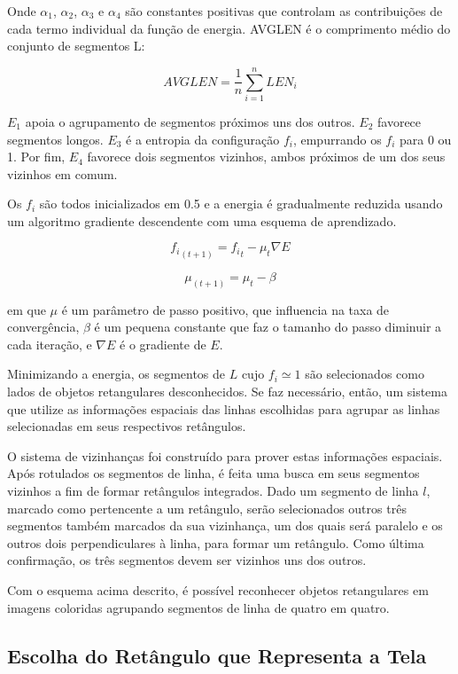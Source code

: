Onde $ \alpha _1 $, $ \alpha _2 $, $ \alpha _3 $ e $ \alpha _4 $ são constantes positivas que controlam as contribuições de cada termo individual da função de energia. AVGLEN é o comprimento médio do conjunto de segmentos L:

$$ AVGLEN = \frac{1}{n} \displaystyle \sum_{i=1}^{n} LEN_i $$

$E_1$ apoia o agrupamento de segmentos próximos uns dos outros. $E_2$ favorece segmentos longos. $E_3$ é a entropia da configuração ${f_i}$, empurrando os ${f_i}$ para 0 ou 1. Por fim, $E_4$ favorece dois segmentos vizinhos, ambos próximos de um dos seus vizinhos em comum.

Os $ {f_i} $ são todos inicializados em 0.5 e a energia é gradualmente reduzida usando um algoritmo gradiente descendente com uma esquema de aprendizado.

$$ {f_i}_{(t+1)} = {f_i}_t - \mu_t \nabla E $$

$$ \mu_{(t+1)} = \mu_t - \beta $$

em que $\mu$ é um parâmetro de passo positivo, que influencia na taxa de convergência, $\beta$ é um pequena constante que faz o tamanho do passo diminuir a cada iteração, e $ \nabla E $ é o gradiente de $E$.

Minimizando a energia, os segmentos de $L$ cujo $f_i \simeq 1$ são selecionados como lados de objetos retangulares desconhecidos. Se faz necessário, então, um sistema que utilize as informações espaciais das linhas escolhidas para agrupar as linhas selecionadas em seus respectivos retângulos.

O sistema de vizinhanças foi construído para prover estas informações espaciais. Após rotulados os segmentos de linha, é feita uma busca em seus segmentos vizinhos a fim de formar retângulos integrados. Dado um segmento de linha $l$, marcado como pertencente a um retângulo, serão selecionados outros três segmentos também marcados da sua vizinhança, um dos quais será paralelo e os outros dois perpendiculares à linha, para formar um retângulo. Como última confirmação, os três segmentos devem ser vizinhos uns dos outros.

Com o esquema acima descrito, é possível reconhecer objetos retangulares em imagens coloridas agrupando segmentos de linha de quatro em quatro.

\subsection {Escolha do Retângulo que Representa a Tela}

